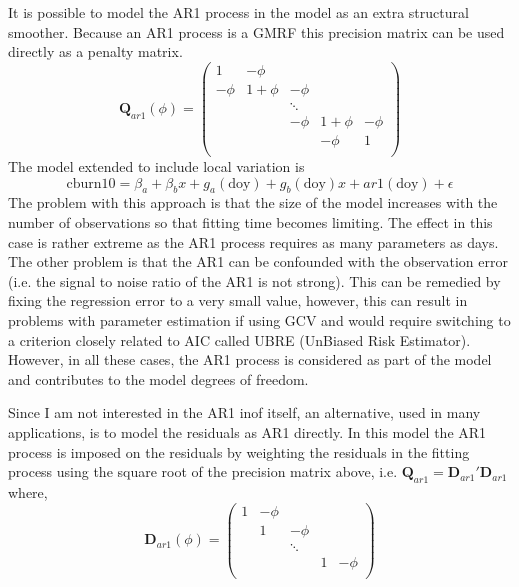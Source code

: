 It is possible to model the AR1 process in the model as an extra structural smoother. Because an AR1 process is a GMRF this precision matrix can be used directly as a penalty matrix.
\begin{equation}
\bm{Q}_{ar1}(\phi) = 
\begin{pmatrix} 
1 & -\phi &  &  &  \\ 
 -\phi& 1 + \phi & -\phi &  &  \\ 
 &  & \ddots &  &  \\ 
 &  & -\phi & 1 + \phi & -\phi \\ 
 &  &  & -\phi & 1 \\ 
\end{pmatrix}
\end{equation}
The model extended to include local variation is
\begin{equation}
  \text{cburn10} = \beta_a + \beta_b x + g_a(\text{doy}) + g_b(\text{doy})x + ar1(\text{doy}) + \epsilon
\end{equation}
The problem with this approach is that the size of the model increases with the number of observations so that fitting time becomes limiting.  The effect in this case is rather extreme as the AR1 process requires as many parameters as days.  The other problem is that the AR1 can be confounded with the observation error (i.e. the signal to noise ratio of the AR1 is not strong).  This can be remedied by fixing the regression error to a very small value, however, this can result in problems with parameter estimation if using GCV and would require switching to a criterion closely related to AIC called UBRE (UnBiased Risk Estimator).  However, in all these cases, the AR1 process is considered as part of the model and contributes to the model degrees of freedom.    

Since I am not interested in the AR1 inof itself, an alternative, used in many applications, is to model the residuals as AR1 directly.  In this model the AR1 process is imposed on the residuals by weighting the residuals in the fitting process using the square root of the precision matrix above, i.e. $\bm{Q}_{ar1} = \bm{D}_{ar1}'\bm{D}_{ar1}$ where,
\begin{equation}
\bm{D}_{ar1}(\phi) = 
\begin{pmatrix} 
1 & -\phi &        &   &       \\ 
  &     1 & -\phi  &   &       \\ 
  &       & \ddots &   &       \\ 
  &       &        & 1 & -\phi \\ 
\end{pmatrix}
\end{equation}

